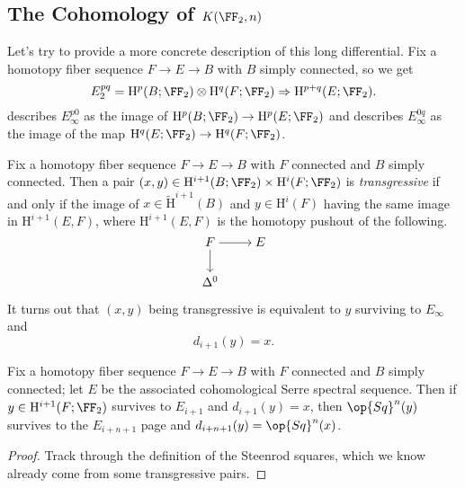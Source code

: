 \documentclass[../notes.tex]{subfiles}
\begin{document}
\subsection{The Cohomology of \texorpdfstring{$K(\FF_2,n)$}{ K(F2,n)}}
Let's try to provide a more concrete description of this long differential. Fix a homotopy fiber sequence $F\to E\to B$ with $B$ simply connected, so we get
\[E_2^{pq}=\mathrm H^p(B;\FF_2)\otimes\mathrm H^q(F;\FF_2)\Rightarrow\mathrm H^{p+q}(E;\FF_2).\]
 describes $E_\infty^{p0}$ as the image of $\mathrm H^p(B;\FF_2)\to\mathrm H^p(E;\FF_2)$ and describes $E_\infty^{0q}$ as the image of the map $\mathrm H^q(E;\FF_2)\to\mathrm H^q(F;\FF_2)$.
\begin{definition}[transgressive]
	Fix a homotopy fiber sequence $F\to E\to B$ with $F$ connected and $B$ simply connected. Then a pair $(x,y)\in\mathrm H^{i+1}(B;\FF_2)\times\mathrm H^i(F;\FF_2)$ is \textit{transgressive} if and only if the image of $x\in\widetilde{\mathrm H}^{i+1}(B)$ and $y\in\mathrm H^i(F)$ having the same image in $\mathrm H^{i+1}(E,F)$, where $\mathrm H^{i+1}(E,F)$ is the homotopy pushout of the following.
	\[\begin{tikzcd}[cramped]
		F & E \\
		{\Delta^0}
		\arrow[from=1-1, to=1-2]
		\arrow[from=1-1, to=2-1]
	\end{tikzcd}\]
\end{definition}
\begin{remark}
	It turns out that $(x,y)$ being transgressive is equivalent to $y$ surviving to $E_\infty$ and
	\[d_{i+1}(y)=x.\]
\end{remark}
\begin{corollary} \label{cor:kudo-transgression}
	Fix a homotopy fiber sequence $F\to E\to B$ with $F$ connected and $B$ simply connected; let $E$ be the associated cohomological Serre spectral sequence. Then if $y\in\mathrm H^{i+1}(F;\FF_2)$ survives to $E_{i+1}$ and $d_{i+1}(y)=x$, then $\op{Sq}^n(y)$ survives to the $E_{i+n+1}$ page and $d_{i+n+1}(y)=\op{Sq}^n(x)$.
\end{corollary}
\begin{proof}
	Track through the definition of the Steenrod squares, which we know already come from some transgressive pairs.
\end{proof}
\end{document}
